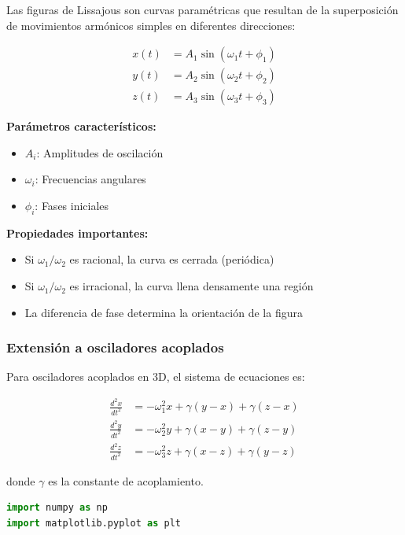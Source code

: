 \documentclass{article}
\begin{document}
\begin{center}
	Las figuras de Lissajous son curvas paramétricas que resultan de la superposición de movimientos armónicos simples en diferentes direcciones:
	
	\begin{align}
		x(t) &= A_1 \sin(\omega_1 t + \phi_1) \\
		y(t) &= A_2 \sin(\omega_2 t + \phi_2) \\
		z(t) &= A_3 \sin(\omega_3 t + \phi_3)
	\end{align}
	
	\textbf{Parámetros característicos:}
	\begin{itemize}
	\item $A_i$: Amplitudes de oscilación
	\item $\omega_i$: Frecuencias angulares
	\item $\phi_i$: Fases iniciales
	\end{itemize}
	
	\textbf{Propiedades importantes:}
	\begin{itemize}
	\item Si $\omega_1/\omega_2$ es racional, la curva es cerrada (periódica)
	\item Si $\omega_1/\omega_2$ es irracional, la curva llena densamente una región
	\item La diferencia de fase determina la orientación de la figura
	\end{itemize}

	\subsubsection{Extensión a osciladores acoplados}
	
	Para osciladores acoplados en 3D, el sistema de ecuaciones es:
	
	\begin{align}
		\frac{d^2x}{dt^2} &= -\omega_1^2 x + \gamma(y - x) + \gamma(z - x) \\
		\frac{d^2y}{dt^2} &= -\omega_2^2 y + \gamma(x - y) + \gamma(z - y) \\
		\frac{d^2z}{dt^2} &= -\omega_3^2 z + \gamma(x - z) + \gamma(y - z)
	\end{align}
	
	donde $\gamma$ es la constante de acoplamiento.

	\begin{lstlisting}[language=Python, caption={Análisis completo de figuras de Lissajous 3D y osciladores acoplados}]
import numpy as np
import matplotlib.pyplot as plt


\end{lstlisting}
\end{center}
\end{document}
